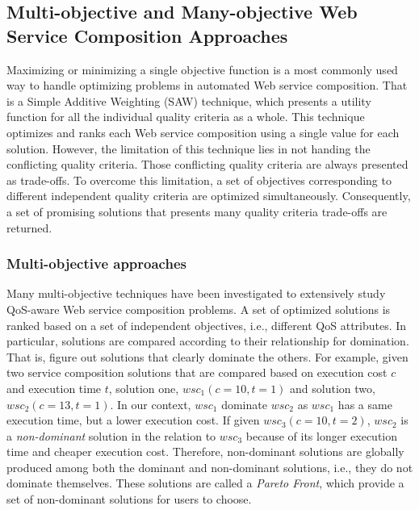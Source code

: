 \subsection{Multi-objective and Many-objective Web Service Composition Approaches}\label{multiobjective}
Maximizing or minimizing a single objective function is a most commonly used way to handle optimizing problems in automated Web service composition.  That is a Simple Additive Weighting (SAW) \cite{hwang1981lecture} technique, which presents a utility function for all the individual quality criteria as a whole. This technique optimizes and ranks each Web service composition using a single value for each solution. However,  the limitation of this technique lies in not handing the conflicting quality criteria.  Those conflicting quality criteria are always presented as trade-offs. To overcome this limitation, a set of objectives corresponding to different independent quality criteria are optimized simultaneously. Consequently,  a set of promising solutions that presents many quality criteria trade-offs are returned.


\subsubsection{Multi-objective approaches}\label{MultiObjective}

Many multi-objective techniques \cite{liu2005dynamic,zhang2010qos,yu2013efficient,yin2014hybrid,xiang2014qos,chen2014partial} have been investigated to extensively study QoS-aware Web service composition problems.  A set of optimized solutions is ranked based on a set of independent objectives, i.e., different QoS attributes. In particular, solutions are compared according to their relationship for domination. That is, figure out solutions that clearly dominate the others. For example, given two service composition solutions that are compared based on execution cost $c$ and execution time $t$, solution one, $wsc_1(c=10,t=1)$ and solution two,  $wsc_2(c=13,t=1)$. In our context, $wsc_1$ dominate $wsc_2$ as $wsc_1$ has a same execution time, but a lower execution cost. If given $wsc_3(c=10,t=2)$, $wsc_2$ is a \textit{non-dominant} solution in the relation to $wsc_3$ because of its longer execution time and cheaper execution cost. Therefore, non-dominant solutions are globally produced among both the dominant and non-dominant solutions, i.e., they do not dominate themselves. These solutions are called a \textit{Pareto Front}, which provide a set of non-dominant solutions for users to choose.


